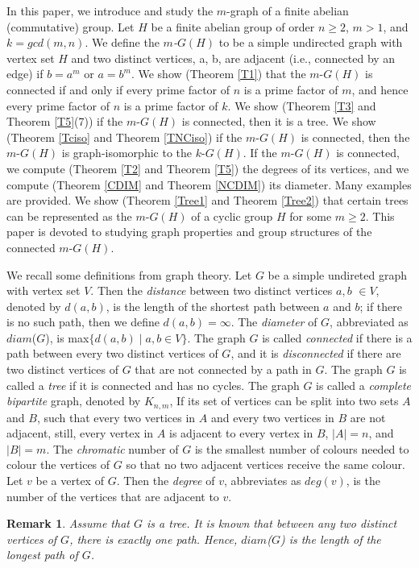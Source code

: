 \documentclass{amsart}
\theoremstyle{plain}
\newtheorem{remk}[thm]{Remark}
\begin{document}
 In this paper, we introduce and study the $m$-graph of a finite abelian (commutative) group. Let $H$ be a finite abelian group of order $n \geq 2$, $m > 1$, and $k = gcd(m, n) $.  We define the {\it $m$-$G(H)$ } to be a simple undirected graph with vertex set $H$ and two distinct vertices, a, b, are adjacent (i.e., connected by an edge) if $b = a^m$ or $a = b^m$.  We show (Theorem \ref{T1}) that the $m$-$G(H)$ is connected if and only if every prime factor of $n$ is a prime factor of $m$, and hence every prime factor of $n$ is a prime factor of $k$. We show (Theorem \ref{T3} and Theorem \ref{T5}(7)) if the $m$-$G(H)$ is connected, then it is a tree.  We show (Theorem \ref{Tciso} and Theorem \ref{TNCiso}) if the $m$-$G(H)$ is connected, then the $m$-$G(H)$ is graph-isomorphic to the $k$-$G(H)$. If the $m$-$G(H)$ is connected, we compute (Theorem \ref{T2} and Theorem \ref{T5}) the degrees of its vertices, and we compute (Theorem \ref{CDIM} and Theorem \ref{NCDIM}) its diameter. Many examples are provided. We show (Theorem \ref{Tree1} and Theorem \ref{Tree2}) that certain trees can be represented as the $m$-$G(H)$ of a cyclic group $H$ for some $m \geq 2$. This paper is devoted to studying graph properties and group structures of the connected $m$-$G(H)$.
 
 We recall some definitions from graph theory.  Let $G$ be a simple undireted graph with vertex set $V$. Then the {\it distance} between two distinct vertices $a, b$ $\in V$, denoted by $d(a, b)$, is the length of the shortest path between $a$ and $b$; if there is no such path, then we define $d(a, b) = \infty$. The {\it diameter} of $G$, abbreviated as $diam$($G$), is max$\{d(a, b) \mid a, b \in V\}$. The graph $G$ is called {\it connected} if there is a path between every two distinct vertices of $G$, and it is {\it disconnected} if there are two distinct vertices of $G$ that are not connected by a path in $G$. The graph $G$ is called a {\it tree} if it is connected and has no cycles. The graph $G$ is called a {\it complete bipartite} graph, denoted by $K_{n, m}$, If its set of vertices can be split into two sets $A$ and $B$, such that every two vertices in $A$ and every two vertices in $B$ are not adjacent, still, every vertex in $A$ is adjacent to every vertex in $B$, $|A| = n$, and $|B| = m$.  The {\it chromatic} number of $G$  is the smallest number of colours needed to colour the vertices of $G$ so that no two adjacent vertices receive the same colour. Let $v$ be a vertex of $G$. Then the {\it degree} of $v$, abbreviates as $deg(v)$, is the number of the vertices that are adjacent to $v$. 
 \begin{remk}
 Assume that $G$ is a tree. It is known that between any two distinct vertices of $G$, there is exactly one path. Hence, $diam$($G$) is the length of the longest path of $G$. 
 \end{remk}
 
\end{document}
